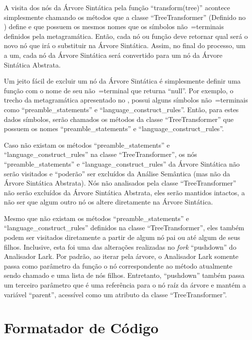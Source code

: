 A visita dos nós da Árvore Sintática pela função ``transform(tree)'' acontece simplesmente chamando os métodos que a classe ``TreeTransformer'' (Definido no ) define e
que possuem os mesmos nomes que os símbolos não~=terminais definidos pela metagramática.
Então,
cada nó ou
função deve retornar qual será o novo nó que irá o substituir na Árvore Sintática.
Assim,
no final do processo,
um a um,
cada nó da Árvore Sintática será convertido para um nó da Árvore Sintática Abstrata.

Um jeito fácil de excluir um nó da Árvore Sintática é simplesmente definir uma função com o nome de seu não~=terminal que returna ``null''.
Por exemplo,
o trecho da metagramática apresentado no ,
possui alguns símbolos não~=terminais como ``preamble\_statements'' e
``language\_construct\_rules''. Então,
para estes dados símbolos,
serão chamados os métodos da classe ``TreeTransformer'' que possuem os nomes ``preamble\_statements'' e
``language\_construct\_rules''.

Caso não existam os métodos ``preamble\_statements'' e
``language\_construct\_rules'' na classe ``TreeTransformer'',
os nós ``preamble\_statements'' e
``language\_construct\_rules'' da Árvore Sintática não serão visitados e
``poderão'' ser excluídos da Análise Semântica (mas não da Árvore Sintática Abstrata).
Nós não analisados pela classe ``TreeTransformer'' não serão excluídos da Árvore Sintática Abstrata,
eles serão mantidos intactos,
a não ser que algum outro nó os altere diretamente na Árvore Sintática.

Mesmo que não existam os métodos ``preamble\_statements'' e
``language\_construct\_rules'' definidos na classe ``TreeTransformer'',
eles também podem ser visitados diretamente a partir de algum nó pai ou
até algum de seus filhos.
Inclusive,
esta foi uma das alterações realizadas no \textit{fork} ``pushdown'' do Analisador Lark.
Por padrão,
ao iterar pela árvore,
o Analisador Lark somente passa como parâmetro da função o nó correspondente ao método atualmente sendo chamado e
uma lista de nós filhos.
Entretanto,
``pushdown'' também passa um terceiro parâmetro que é uma referência para o nó raíz da árvore e
mantém a variável ``parent'',
acessível como um atributo da classe ``TreeTransformer''.


\section{Formatador de Código}

